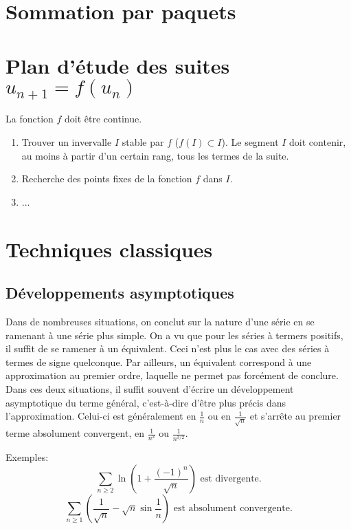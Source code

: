 \section{Sommation par paquets}


\section{Plan d'étude des suites \texorpdfstring{$u_{n+1} = f(u_n)$}{u_(n+1) = f(u_n)}}

La fonction $f$ doit être continue. 
\begin{enumerate}
    \item Trouver un invervalle $I$ stable par $f$ ($f(I) \subset I$). Le segment $I$ doit contenir, au moins à partir d'un certain rang, tous les termes de la suite.
    \item Recherche des points fixes de la fonction $f$ dans $I$.
    \item ...
\end{enumerate}

\section{Techniques classiques}
\subsection{Développements asymptotiques}

Dans de nombreuses situations, on conclut sur la nature d'une série en se ramenant à une série plus simple. On a vu que pour les séries à termers positifs, il suffit de se ramener à un équivalent. Ceci n'est plus le cas avec des séries à termes de signe quelconque. Par ailleurs, un équivalent correspond à une approximation au premier ordre, laquelle ne permet pas forcément de conclure. \\
Dans ces deux situations, il suffit souvent d'écrire un développement asymptotique du terme général, c'est-à-dire d'être plus précis dans l'approximation. Celui-ci est généralement en $\frac{1}{n}$ ou en $\frac{1}{\sqrt{n}}$ et s'arrête au premier terme absolument convergent, en $\frac{1}{n^2}$ ou $\frac{1}{n^{3/2}}$.

Exemples: \\
$$\sum_{n \geqslant 2} \ln \left(1 + \frac{(-1)^n}{\sqrt{n}}\right) \text{ est divergente}.$$
$$\sum_{n \geqslant 1} \left(\frac{1}{\sqrt{n}} - \sqrt{n} \sin \frac{1}{n} \right) \text{ est absolument convergente}.$$

